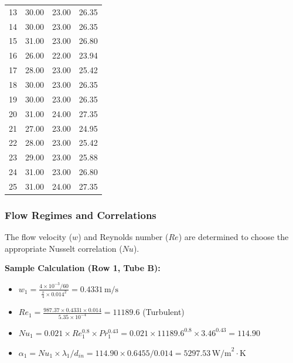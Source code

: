 {\begin{longtable}{|c|c|c|c|}
    13           & 30.00                     & 23.00                     & 26.35                      \\
    14           & 30.00                     & 23.00                     & 26.35                      \\
    15           & 31.00                     & 23.00                     & 26.80                      \\ \hline
    16           & 26.00                     & 22.00                     & 23.94                      \\
    17           & 28.00                     & 23.00                     & 25.42                      \\
    18           & 30.00                     & 23.00                     & 26.35                      \\
    19           & 30.00                     & 23.00                     & 26.35                      \\
    20           & 31.00                     & 24.00                     & 27.35                      \\ \hline
    21           & 27.00                     & 23.00                     & 24.95                      \\
    22           & 28.00                     & 23.00                     & 25.42                      \\
    23           & 29.00                     & 23.00                     & 25.88                      \\
    24           & 31.00                     & 23.00                     & 26.80                      \\
    25           & 31.00                     & 24.00                     & 27.35                      \\ \hline
\end{longtable}
}

\subsubsection{Flow Regimes and Correlations}\label{flow-correlations}

The flow velocity ($w$) and Reynolds number ($Re$) are determined to choose the appropriate Nusselt correlation ($Nu$).

\textbf{Sample Calculation (Row 1, Tube B):}
\begin{itemize}
    \item $w_1 = \frac{4 \times 10^{-3} / 60}{\frac{\pi}{4} \times 0.014^2} = 0.4331 \, \text{m/s}$
    \item $Re_1 = \frac{987.37 \times 0.4331 \times 0.014}{5.35 \times 10^{-4}} = 11189.6$ (Turbulent)
    \item $Nu_1 = 0.021 \times Re_1^{0.8} \times Pr_1^{0.43} = 0.021 \times 11189.6^{0.8} \times 3.46^{0.43} = 114.90$
    \item $\alpha_1 = Nu_1 \times \lambda_1 / d_{in} = 114.90 \times 0.6455 / 0.014 = 5297.53 \, \text{W/m}^2\cdot\text{K}$
\end{itemize}

